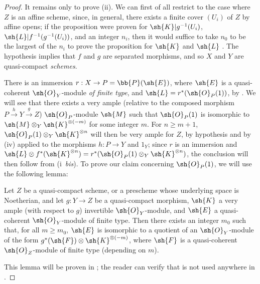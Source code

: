 \begin{proof}
It remains only to prove (ii).
We can first of all restrict to the case where $Z$ is an affine scheme, since, in general, there exists a finite cover $(U_i)$ of $Z$ by affine opens;
if the proposition were proven for $\sh{K}|g^{-1}(U_i)$, $\sh{L}|f^{-1}(g^{-1}(U_i))$, and an integer $n_i$, then it would suffice to take $n_0$ to be the largest of the $n_i$ to prove the proposition for $\sh{K}$ and $\sh{L}$ .
The hypothesis implies that $f$ and $g$ are separated morphisms, and so $X$ and $Y$ are quasi-compact \emph{schemes}.

There is an immersion $r:X\to P=\bb{P}(\sh{E})$, where $\sh{E}$ is a quasi-coherent $\sh{O}_Y$-module \emph{of finite type}, and $\sh{L}=r^*(\sh{O}_P(1))$, by .
We will see that there exists a very ample (relative to the composed morphism $P\xrightarrow{h}Y\xrightarrow{g}Z$) $\sh{O}_P$-module $\sh{M}$ such that $\sh{O}_P(1)$ is isomorphic to $\sh{M}\otimes_Y\sh{K}^{\otimes(-m)}$ for some integer $m$.
For $n\geq m+1$, $\sh{O}_P(1)\otimes_Y\sh{K}^{\otimes n}$ will then be very ample for $Z$, by hypothesis and by (iv) applied to the morphisms $h:P\to Y$ and $1_Y$;
since $r$ is an immersion and $\sh{L}\otimes f^*(\sh{K}^{\otimes n}) = r^*(\sh{O}_P(1)\otimes_Y\sh{K}^{\otimes n})$, the conclusion will then follow from (i~\emph{bis}).
To prove our claim concerning $\sh{O}_P(1)$, we will use the following lemma:

  \begin{lemma}[4.4.10.1]
  \label{II.4.4.10.1}
  Let $Z$ be a quasi-compact scheme, or a prescheme whose underlying space is Noetherian, and let $g:Y\to Z$ be a quasi-compact morphism, $\sh{K}$ a very ample (with respect to $g$) invertible $\sh{O}_Y$-module, and $\sh{E}$ a quasi-coherent $\sh{O}_Y$-module of finite type.
  Then there exists an integer $m_0$ such that, for all $m\geq m_0$, $\sh{E}$ is isomorphic to a quotient of an $\sh{O}_Y$-module of the form $g^*(\sh{F})\otimes\sh{K}^{\otimes(-m)}$, where $\sh{F}$ is a quasi-coherent $\sh{O}_Z$-module of finite type (depending on $m$).
  \end{lemma}

This lemma will be proven in ;
the reader can verify that  is not used anywhere in .


\end{proof}
